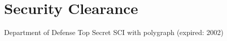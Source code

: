 \section{Security Clearance}

Department of Defense Top Secret SCI with polygraph (expired: 2002)

%
